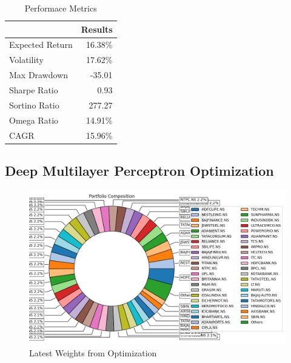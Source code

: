  \begin{table}[H]

    \centering %
    \label{tab:performance_metrics}
    
    \caption{Performace Metrics}
    \vspace{5mm} %

\begin{tabular}{lr}
\toprule
 & Results \\
\midrule
Expected Return & 16.38\% \\
Volatility & 17.62\% \\
Max Drawdown & -35.01 \\
Sharpe Ratio & 0.93 \\
Sortino Ratio & 277.27 \\
Omega Ratio & 14.91\% \\
CAGR & 15.96\% \\
\bottomrule
\end{tabular}
\end{table}

\subsection{Deep Multilayer Perceptron Optimization}

\begin{figure}[H]
   \centering
   \includegraphics[width=1\linewidth]{images/DMLP/Weights.png}
   \caption{Latest Weights from Optimization}
   \label{fig:network_architecture1}
 \end{figure}

